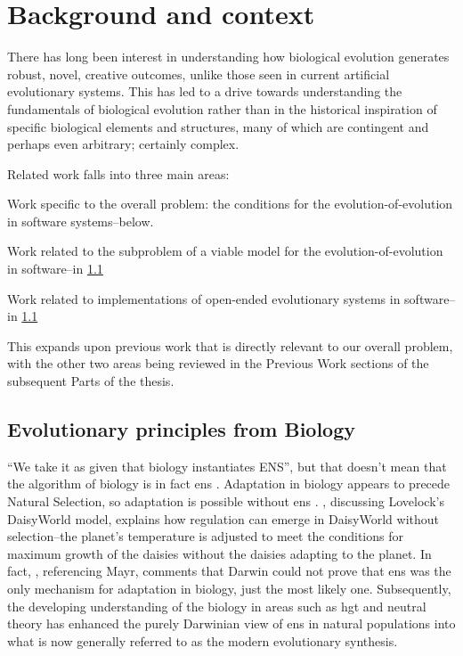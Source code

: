 \section{Background and context}\label{background-and-context}

There has long been interest in understanding how biological evolution generates robust, novel, creative outcomes, unlike those seen in current artificial evolutionary systems. This has led to a drive towards understanding the fundamentals of biological evolution rather than in the historical inspiration of specific biological elements and structures, many of which are contingent and perhaps even arbitrary; certainly complex.

Related work falls into three main areas:

\begin{compactenum}
\item Work specific to the overall problem: the conditions for the evolution-of-evolution in software systems--below.
\item Work related to the subproblem of a viable model for the evolution-of-evolution in software--in \ref{}
\item Work related to implementations of open-ended evolutionary systems in software--in \ref{}
\end{compactenum}
	
This  expands upon previous work that is directly relevant to our overall problem, with the other two areas being reviewed in the Previous Work sections of the subsequent Parts of the thesis. 

\subsection{Evolutionary principles from Biology}

``We take it as given that biology instantiates ENS'', but that doesn't mean that the algorithm of biology is in fact \gls{ens} \parencite{Watson2012}. Adaptation in biology appears to precede Natural Selection, so adaptation is possible without \gls{ens} \cite{Watson2010}. \cite{Saunders1994}, discussing Lovelock's DaisyWorld model, explains how regulation can emerge in DaisyWorld without selection--the planet's temperature is adjusted to meet the conditions for maximum growth of the daisies without the daisies adapting to the planet. In fact, \cite{Saunders1994}, referencing Mayr, comments that Darwin could not prove that \gls{ens} was the only mechanism for adaptation in biology, just the most likely one. Subsequently, the developing understanding of the biology in areas such as \gls{hgt} and neutral theory \cite{Kimura:1968uq} has enhanced the purely Darwinian view of \gls{ens} in natural populations into what is now generally referred to as the modern evolutionary synthesis.

